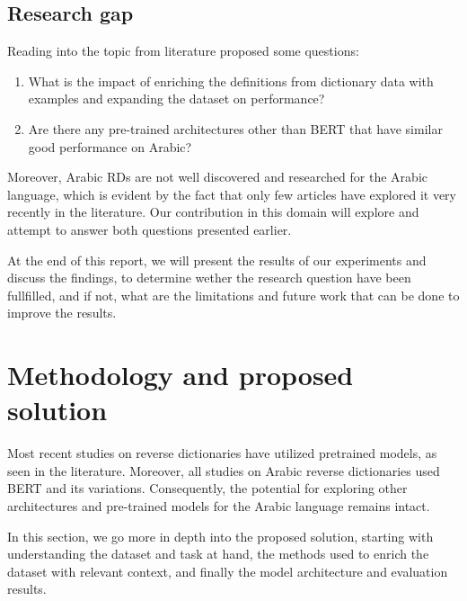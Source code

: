 \documentclass[12pt]{article}
\begin{document}
\subsection{Research gap}

Reading into the topic from literature proposed some questions:
\begin{enumerate}
    \item What is the impact of enriching the definitions from dictionary data with examples and expanding the dataset on performance?
    \item Are there any pre-trained architectures other than BERT that have similar good performance on Arabic?
\end{enumerate}

Moreover, Arabic RDs are not well discovered and researched for the Arabic language, which is evident by the fact that only few articles have explored it very recently in the literature. Our contribution in this domain will explore and attempt to answer both questions presented earlier.

At the end of this report, we will present the results of our experiments and discuss the findings, to determine wether the research question have been fullfilled, and if not, what are the limitations and future work that can be done to improve the results.

\newpage

\section{Methodology and proposed solution}

Most recent studies on reverse dictionaries have utilized pretrained models, as seen in the literature. Moreover, all studies on Arabic reverse dictionaries used BERT and its variations. Consequently, the potential for exploring other architectures and pre-trained models for the Arabic language remains intact. 

In this section, we go more in depth into the proposed solution, starting with understanding the dataset and task at hand, the methods used to enrich the dataset with relevant context, and finally the model architecture and evaluation results.
\end{document}

